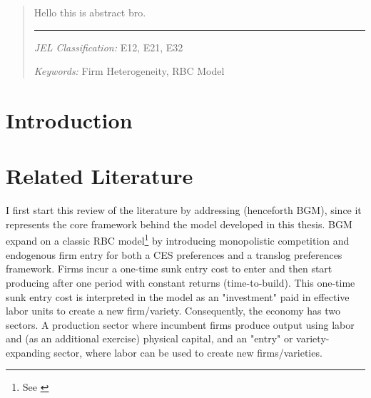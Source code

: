 \documentclass[a4paper,12pt]{article} %
\numberwithin{equation}{section} %
\numberwithin{figure}{section}
\numberwithin{table}{section}
\begin{document}
\newpage
\begin{abstract} %

Hello this is abstract bro.

\begin{center}
\rule{10cm}{0.4pt}
\end{center}

\noindent
\textit{JEL Classification:} E12, E21, E32 %

\noindent
\textit{Keywords:} Firm Heterogeneity, RBC Model %
\end{abstract}

\newpage
{} %
\pagestyle{fancy}
\fancyhf{}
\fancyhead[C]{\leftmark}
\fancyfoot[C]{\thepage}

\thispagestyle{plain}
\section{Introduction}
\label{sec:introduction}


\section{Related Literature}
\label{sec:literature}



I first start this review of the literature by addressing \textcite{bilbiie2012endogenous} (henceforth BGM), since it represents the core framework behind the model developed in this thesis. 
BGM expand on a classic RBC model\footnote{See \textcite{campbell1994inspecting}} by introducing monopolistic competition and endogenous firm entry for both a CES preferences and a translog preferences framework. 
Firms incur a one-time sunk entry cost to enter and then start producing after one period with constant returns (time-to-build). 
This one-time sunk entry cost is interpreted in the model as an "investment" paid in effective labor units to create a new firm/variety. Consequently, the economy has two sectors. 
A production sector where incumbent firms produce output using labor and (as an additional exercise) physical capital, and an "entry" or variety-expanding sector, where labor can be used to create new firms/varieties. 
\end{document}
